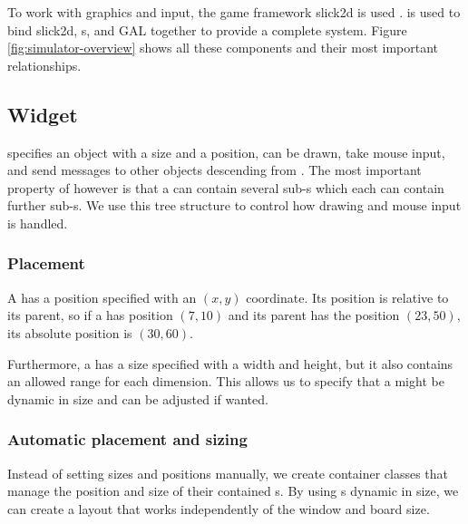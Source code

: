 To work with graphics and input, the game framework slick2d is used
\cite{slick2d}.  is used to bind slick2d,
s, and GAL together to provide a complete system.
Figure \ref{fig:simulator-overview} shows all these components and their
most important relationships.


\subsection{Widget}
\label{sec:widget}

 specifies an object with a size and a position,
can be drawn, take mouse input, and send messages to other objects
descending from . The most important property of
 however is that a  can contain
several sub-s which each can contain further
sub-s. We use this tree structure to control how
drawing and mouse input is handled.

\subsubsection{Placement}

A  has a position specified with an $(x, y)$
coordinate. Its position is relative to its parent, so if a
 has position $(7, 10)$ and its parent has the position
$(23, 50)$, its absolute position is $(30, 60)$.

Furthermore, a  has a size specified with a width and height,
but it also contains an allowed range for each dimension. This allows us to
specify that a  might be dynamic in size and can be adjusted if
wanted.

\subsubsection{Automatic placement and sizing}

Instead of setting sizes and positions manually, we create container
classes that manage the position and size of their contained
s. By using s dynamic in
size, we can create a layout that works independently of the window and
board size.

